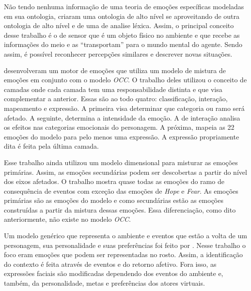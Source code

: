 Não tendo nenhuma informação de uma teoria de emoções específicas modeladas em
sua ontologia, \citet{wks2008towards} criaram uma ontologia de alto nível se
aproveitando de outra ontologia de alto nível e de uma de analise léxica.
Assim, o principal conceito desse trabalho é o de sensor que é um objeto
físico no ambiente e que recebe as informações do meio e as ``transportam''
para o mundo mental do agente. Sendo assim, é possível reconhecer
percepções similares e descrever novas situações.

\citet{springerlink:10.1007/978-3-642-01639-448} desenvolveram um motor de
emoções que utiliza um modelo de mistura de emoções em conjunto com o modelo
\emph{OCC}. O trabalho deles utilizou o conceito de camadas onde cada camada tem uma
responsabilidade distinta e que visa complementar a anterior. Essas são ao todo
quatro: classificação, interação, mapeamento e expressão. A primeira visa
determinar que categoria ou ramo será afetado. A seguinte, determina a
intensidade da emoção. A de interação analisa os efeitos nas categorias
emocionais do personagem. A próxima, mapeia as 22 emoções do modelo para pelo
menos uma expressão. A expressão propriamente dita é feita pela última camada.

Esse trabalho ainda utilizou um modelo dimensional para misturar as emoções
primárias. Assim, as emoções secundárias podem ser descobertas a partir do
nível dos eixos afetados. O trabalho mostra quase todas as emoções do
ramo de consequência de eventos com exceção das emoções de \emph{Hope} e
\emph{Fear}. As emoções primárias são as emoções do modelo \occ e como
secundárias estão as emoções construídas a partir da mistura dessas emoções.
Essa diferenciação, como dito anteriormente, não existe no modelo \emph{OCC}.

Um modelo genérico que representa o ambiente e eventos que estão a volta de um
personagem, sua personalidade e suas preferências foi feito por
\citet{lera2009semantic}. Nesse trabalho o foco eram emoções que podem ser
representadas no rosto. Assim, a identificação do contexto é feita através de
eventos e do retorno afetivo. Fora isso, as expressões faciais são modificadas
dependendo dos eventos do ambiente e, também, da personalidade, metas e
preferências dos atores virtuais.

